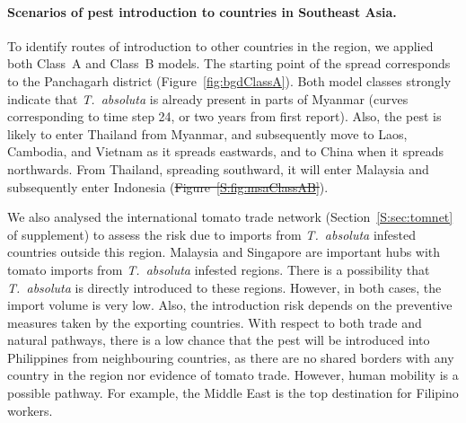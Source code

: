 \documentclass[11pt]{article}
\newcommand{\tuta}{\emph{T.~absoluta}}
\theoremstyle{definition}
\providecommand{\DIFaddtex}[1]{{\protect\color{blue}\uwave{#1}}} %
\providecommand{\DIFdeltex}[1]{{\protect\color{red}\sout{#1}}}                      %
\providecommand{\DIFaddbegin}{} %
\providecommand{\DIFaddend}{} %
\providecommand{\DIFdelbegin}{} %
\providecommand{\DIFdelend}{} %
\providecommand{\DIFadd}[1]{\texorpdfstring{\DIFaddtex{#1}}{#1}} %
\providecommand{\DIFdel}[1]{\texorpdfstring{\DIFdeltex{#1}}{}} %
\newcommand{\DIFscaledelfig}{0.5}
\newlength{\DIFdelgraphicswidth} %
\newlength{\DIFdelgraphicsheight} %
\newcommand{\DIFaddincludegraphics}[2][]{{\color{blue}\fbox{\DIFOincludegraphics[#1]{#2}}}} %
\newcommand{\DIFdelincludegraphics}[2][]{%
\sbox{\DIFdelgraphicsbox}{\DIFOincludegraphics[#1]{#2}}%
\settoboxwidth{\DIFdelgraphicswidth}{\DIFdelgraphicsbox} %
\settoboxtotalheight{\DIFdelgraphicsheight}{\DIFdelgraphicsbox} %
\scalebox{\DIFscaledelfig}{%
\parbox[b]{\DIFdelgraphicswidth}{\usebox{\DIFdelgraphicsbox}\\[-\baselineskip] \rule{\DIFdelgraphicswidth}{0em}}\llap{\resizebox{\DIFdelgraphicswidth}{\DIFdelgraphicsheight}{%
\setlength{\unitlength}{\DIFdelgraphicswidth}%
\begin{picture}(1,1)%
\thicklines\linethickness{2pt} %
{\color[rgb]{1,0,0}\put(0,0){\framebox(1,1){}}}%
{\color[rgb]{1,0,0}\put(0,0){\line( 1,1){1}}}%
{\color[rgb]{1,0,0}\put(0,1){\line(1,-1){1}}}%
\end{picture}%
}\hspace*{3pt}}} %
} %
\DeclareRobustCommand{\DIFaddbegin}{\DIFOaddbegin \let\includegraphics\DIFaddincludegraphics} %
\DeclareRobustCommand{\DIFaddend}{\DIFOaddend \let\includegraphics\DIFOincludegraphics} %
\DeclareRobustCommand{\DIFdelbegin}{\DIFOdelbegin \let\includegraphics\DIFdelincludegraphics} %
\DeclareRobustCommand{\DIFdelend}{\DIFOaddend \let\includegraphics\DIFOincludegraphics} %
\begin{document}
\paragraph{Scenarios of pest introduction to countries in Southeast Asia.}
To identify routes of introduction to other countries in the region, we
applied both Class~A and Class~B models. The starting point of the spread
corresponds to the Panchagarh district (Figure~\ref{fig:bgdClassA}). Both model
classes strongly indicate that \tuta{} is already present in parts of
Myanmar (curves corresponding to time step 24, or two years from first
report). Also, the pest is likely to enter Thailand from Myanmar, and
subsequently move to Laos, Cambodia, and Vietnam as it spreads eastwards, and
to China when it spreads northwards. From Thailand, spreading southward, it
will enter Malaysia and subsequently enter Indonesia
(\DIFdelbegin \DIFdel{Figure~\ref{S:fig:msaClassAB}}\DIFdelend \DIFaddbegin \DIFadd{Figures~\ref{fig:msaClassA} and~\ref{fig:msaClassB}}\DIFaddend ).


We also analysed the international tomato trade network
(Section~\ref{S:sec:tomnet} of supplement) to assess the risk due to
imports from \tuta{} infested countries outside this region.  Malaysia and
Singapore are important hubs with tomato imports from \tuta{} infested
regions. There is a possibility that \tuta{} is directly introduced to
these regions.  However, in both cases, the import volume is very low.
Also, the introduction risk depends on the preventive measures taken by the
exporting countries. With respect to both trade and natural pathways, there
is a low chance that the pest will be introduced into Philippines from
neighbouring countries, as there are no shared borders with any country in
the region nor evidence of tomato trade. However, human mobility is a
possible pathway. For example, the Middle East is the top destination for
Filipino workers.%
\end{document}
